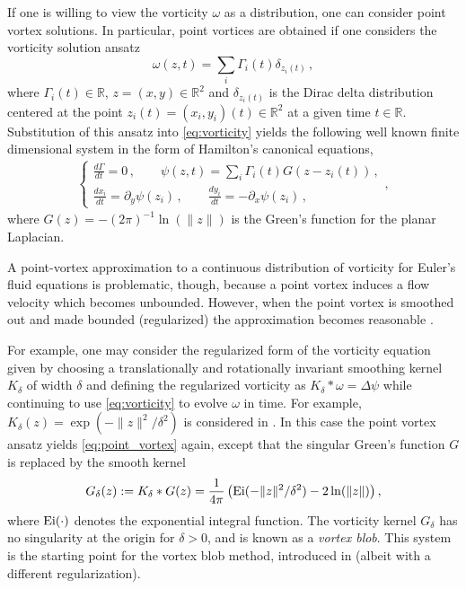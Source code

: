 \documentclass[12pt]{amsart}
\theoremstyle{remark}
\begin{document}
If one is willing to view the vorticity $\omega$ as a distribution, one can consider point vortex solutions.
In particular, point vortices are obtained if one considers the vorticity solution ansatz 
\[\omega(z,t) = \sum_{i} \Gamma_i(t) \delta_{z_i(t)}\,,\]
where $\Gamma_i(t) \in \mathbb{R}$, $z=(x,y) \in \mathbb{R}^2$ and $\delta_{z_i(t)}$ is the Dirac delta distribution centered at the point $z_i(t) = (x_i,y_i)(t) \in \mathbb{R}^2$
at a given time $t \in \mathbb{R}$.
Substitution of this ansatz into \eqref{eq:vorticity} yields the following well known finite dimensional system in the form  of Hamilton's canonical equations,
\begin{align}
\begin{cases}
	\frac{d \Gamma}{dt} = 0 \,,\quad  \quad \psi(z,t) = \sum_i  \Gamma_i(t) G(z-z_i(t)) \,, \\
	\frac{dx_i}{dt} = \partial_y \psi(z_i) \,,\quad  \quad \frac{dy_i}{dt} = - \partial_x \psi(z_i)\,,
\end{cases} \label{eq:point_vortex},
\end{align}
where $G(z) =  - (2\pi)^{-1} \ln( \| z \|)$ is the Green's function for the planar Laplacian. 

A point-vortex approximation to a continuous distribution of vorticity for Euler's fluid equations is problematic, though, because a point vortex induces a flow velocity which becomes unbounded. However, when the point vortex is smoothed out and made bounded (regularized) the approximation becomes reasonable  \cite{Chorin1973}.

For example, one may consider the regularized form of the vorticity equation given by
choosing a translationally and rotationally invariant smoothing kernel $K_\delta$ of width $\delta$ and defining the regularized vorticity as 
$K_\delta* \omega = \Delta \psi$ while continuing to use \eqref{eq:vorticity} to evolve $\omega$ in time.
For example, $K_\delta (z) = \exp( - \| z\|^2 / \delta^2)$ is considered in \cite{BealeMajda1985}.
In this case the point vortex ansatz yields \eqref{eq:point_vortex} again, except that the singular Green's function $G$ is replaced by the smooth kernel
\begin{align}
	G_\delta(z) := K_\delta*G(z) = \frac{1}{4\pi} \left( {\rm Ei}(- \| z \|^2 / \delta^2) - 2\ln ( \| z \|) \right), \label{eq:kernel}
\end{align}
where ${\rm Ei}( \cdot )$ denotes the exponential integral function.
The vorticity kernel $G_\delta$ has no singularity at the origin for $\delta > 0$, and is known as a \textit{vortex blob}.
This system is the starting point for the vortex blob method, introduced in \cite{Chorin1973} (albeit with a different regularization).
\end{document}
